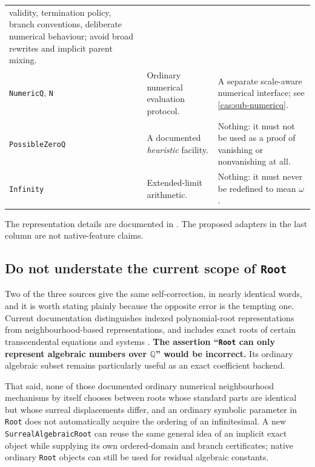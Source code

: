 \documentclass[11pt,letterpaper]{article}
\numberwithin{equation}{section}
\theoremstyle{definition}
\theoremstyle{remark}
\newcommand{\Q}{\mathbb Q}
\begin{document}
\begin{longtable}{@{}P{0.24\textwidth}P{0.33\textwidth}P{0.35\textwidth}@{}}
validity, termination policy, branch conventions, deliberate numerical
behaviour; avoid broad rewrites and implicit parent mixing.\\[0.5em]
\texttt{NumericQ}, \texttt{N} & Ordinary numerical evaluation protocol. & A
separate scale-aware numerical interface; see
\cref{cas:sub-numericq}.\\[0.5em]
\texttt{PossibleZeroQ} & A documented \emph{heuristic} facility. & Nothing:
it must not be used as a proof of vanishing or nonvanishing at all.\\[0.5em]
\texttt{Infinity} & Extended-limit arithmetic. & Nothing: it must never be
redefined to mean $\omega$.\\
\bottomrule
\end{longtable}
\endgroup
The representation details are documented in
\cite{cas:WLRoot,cas:WLAlgebraic,cas:WLRootReduce,cas:WLSeriesData,%
cas:WLSeriesCoefficient,cas:WLSeries,cas:WLInverseSeries,cas:WLAsymptotic,%
cas:WLAsymptoticSolve,cas:WLDifferentialRoot,cas:WLUpValues,cas:WLInactive,%
cas:WLNumericQ,cas:WLPossibleZeroQ,cas:WLInfinity,cas:WLSpecial}. The proposed
adapters in the last column are not native-feature claims.

\subsection{Do not understate the current scope of \texttt{Root}}
\label{cas:sub-rootscope}
Two of the three sources give the same self-correction, in nearly identical
words, and it is worth stating plainly because the opposite error is the
tempting one. Current documentation distinguishes indexed polynomial-root
representations from neighbourhood-based representations, and includes exact
roots of certain transcendental equations and systems \cite{cas:WLRoot}.
\textbf{The assertion ``\texttt{Root} can only represent algebraic numbers over
$\Q$'' would be incorrect.} Its ordinary algebraic subset remains particularly
useful as an exact coefficient backend.

That said, none of those documented ordinary numerical neighbourhood mechanisms
by itself chooses between roots whose standard parts are identical but whose
surreal displacements differ, and an ordinary symbolic parameter in
\texttt{Root} does not automatically acquire the ordering of an infinitesimal. A
new \texttt{SurrealAlgebraicRoot} can reuse the same general idea of an implicit
exact object while supplying its own ordered-domain and branch certificates;
native ordinary \texttt{Root} objects can still be used for residual algebraic
constants.
\end{document}
